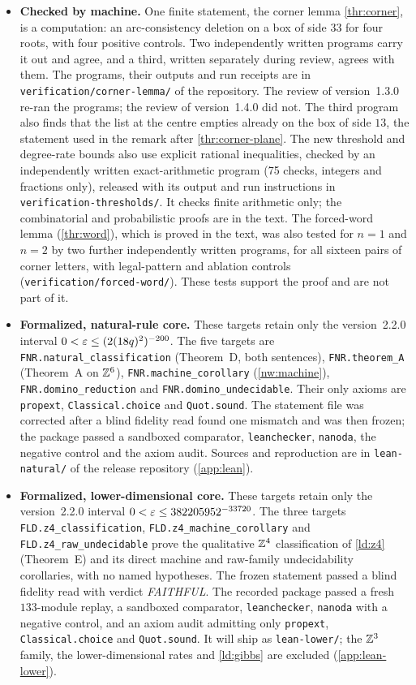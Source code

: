 \begin{itemize}
\item \textbf{Checked by machine.} One finite statement, the corner lemma \cref{thr:corner}, is a computation: an arc-consistency deletion on a box of side $33$ for four roots, with four positive controls. Two independently written programs carry it out and agree, and a third, written separately during review, agrees with them. The programs, their outputs and run receipts are in \texttt{verification/corner-lemma/} of the repository. The review of version~1.3.0 re-ran the programs; the review of version~1.4.0 did not. The third program also finds that the list at the centre empties already on the box of side $13$, the statement used in the remark after \cref{thr:corner-plane}. The new threshold and degree-rate bounds also use explicit rational inequalities, checked by an independently written exact-arithmetic program (75 checks, integers and fractions only), released with its output and run instructions in \texttt{verification-\allowbreak thresholds/}. It checks finite arithmetic only; the combinatorial and probabilistic proofs are in the text. The forced-word lemma (\cref{thr:word}), which is proved in the text, was also tested for $n=1$ and $n=2$ by two further independently written programs, for all sixteen pairs of corner letters, with legal-pattern and ablation controls (\texttt{verification/forced-word/}). These tests support the proof and are not part of it.
\item \textbf{Formalized, natural-rule core.} These targets retain only the version~2.2.0 interval $0<\varepsilon\le(2(18q)^2)^{-200}$. The five targets are \nolinkurl{FNR.natural_classification} (Theorem~D, both sentences), \nolinkurl{FNR.theorem_A} (Theorem~A on $\mathbb{Z}^6$), \nolinkurl{FNR.machine_corollary} (\cref{nw:machine}), \nolinkurl{FNR.domino_reduction} and \nolinkurl{FNR.domino_undecidable}. Their only axioms are \texttt{propext}, \texttt{Classical.choice} and \texttt{Quot.sound}. The statement file was corrected after a blind fidelity read found one mismatch and was then frozen; the package passed a sandboxed comparator, \texttt{leanchecker}, \texttt{nanoda}, the negative control and the axiom audit. Sources and reproduction are in \texttt{lean-natural/} of the release repository (\cref{app:lean}).
\item \textbf{Formalized, lower-dimensional core.} These targets retain only the version~2.2.0 interval $0<\varepsilon\le382205952^{-33720}$. The three targets \nolinkurl{FLD.z4_classification}, \nolinkurl{FLD.z4_machine_corollary} and \nolinkurl{FLD.z4_raw_undecidable} prove the qualitative $\mathbb{Z}^4$ classification of \cref{ld:z4} (Theorem~E) and its direct machine and raw-family undecidability corollaries, with no named hypotheses. The frozen statement passed a blind fidelity read with verdict \emph{FAITHFUL}. The recorded package passed a fresh $133$-module replay, a sandboxed comparator, \texttt{leanchecker}, \texttt{nanoda} with a negative control, and an axiom audit admitting only \texttt{propext}, \texttt{Classical.choice} and \texttt{Quot.sound}. It will ship as \texttt{lean-lower/}; the $\mathbb{Z}^3$ family, the lower-dimensional rates and \cref{ld:gibbs} are excluded (\cref{app:lean-lower}).

\end{itemize}
